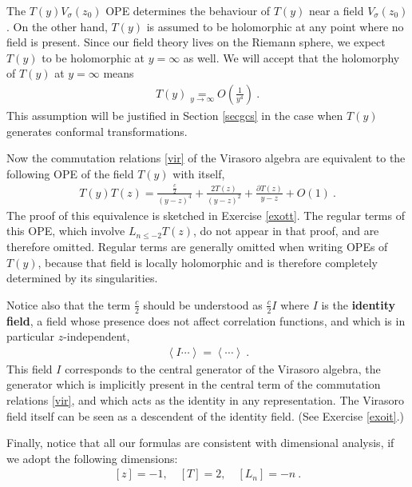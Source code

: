 \documentclass[12pt, a4paper, notitlepage, twoside]{report}
\numberwithin{equation}{section}
\theoremstyle{break}
\begin{document}
The $T(y)V_\sigma(z_0)$ OPE determines  the behaviour of $T(y)$ near a field $V_\sigma(z_0)$.
On the other hand, $T(y)$ is assumed to be holomorphic at any point where no field is present.
Since our field theory lives on the Riemann sphere, we expect $T(y)$ to be holomorphic at $y=\infty$ as well.
We will accept that the holomorphy of $T(y)$ at $y=\infty$ means
\begin{align}
 \boxed{T(y) \underset{y\to \infty}{=} O\left(\frac{1}{y^4}\right)}\ .
\label{tyi}
\end{align}
This assumption will be justified in Section \ref{secgcs} in the case when $T(y)$ generates conformal transformations.

Now the commutation relations \eqref{vir} of the Virasoro algebra are equivalent to the following OPE of the field $T(y)$ with itself,
\begin{align}
 \boxed{T(y)T(z) = \frac{\frac{c}{2}}{(y-z)^4} + \frac{2T(z)}{(y-z)^2} + \frac{\partial T(z)}{y-z} + O(1)}\ .
\label{tt}
\end{align}
The proof of this equivalence is sketched in Exercise \ref{exott}. 
The regular terms of this OPE, which involve $L_{n\leq -2} T(z)$, do not appear in that proof, and are therefore omitted. 
Regular terms are generally omitted when writing OPEs of $T(y)$, because that field is locally holomorphic and is therefore completely determined by its singularities. 

Notice also that the term $\frac{c}{2}$ should be understood as $\frac{c}{2}I$ where $I$ is the \textbf{\boldmath identity field}, a field whose presence does not affect correlation functions, and which is in particular $z$-independent,
\begin{align}
 \left\langle I \cdots \right\rangle = \left\langle \cdots \right\rangle \ .
\label{ivac}
\end{align}
This field $I$ corresponds to the central generator of the Virasoro algebra, the generator which is implicitly present in the central term of the commutation relations \eqref{vir}, and which acts as the identity in any representation.
The Virasoro field itself can be seen as a descendent of the identity field. (See Exercise \ref{exoit}.)

Finally, notice that all our formulas are consistent with dimensional analysis, if we adopt the following dimensions:
\begin{align}
 \boxed{[z]=-1,\quad [T]=2, \quad [L_n]=-n}\ .
\label{zaz}
\end{align}
\end{document}
